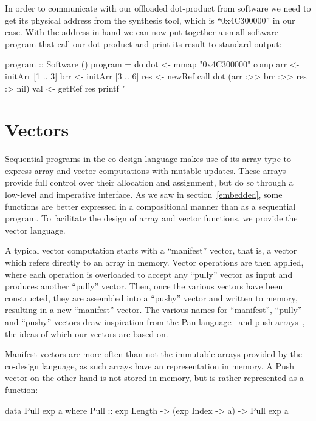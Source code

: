 \documentclass[../paper.tex]{subfiles}
\begin{document}
In order to communicate with our offloaded dot-product from software we need to get its physical address from the synthesis tool, which is ``0x4C300000'' in our case. With the address in hand we can now put together a small software program that call our dot-product and print its result to standard output:

\begin{code}
program :: Software ()
program = do
  dot <- mmap "0x4C300000" comp
  arr <- initArr [1 .. 3]
  brr <- initArr [3 .. 6]
  res <- newRef
  call dot (arr :>> brr :>> res :> nil)
  val <- getRef res
  printf "%
\end{code}

\section{Vectors}
\label{vectors}

Sequential programs in the co-design language makes use of its array type to express array and vector computations with mutable updates. These arrays provide full control over their allocation and assignment, but do so through a low-level and imperative interface. As we saw in section~\ref{embedded}, some functions are better expressed in a compositional manner than as a sequential program. To facilitate the design of array and vector functions, we provide the vector language. 

A typical vector computation starts with a ``manifest'' vector, that is, a vector which refers directly to an array in memory. Vector operations are then applied, where each operation is overloaded to accept any ``pully'' vector as input and produces another ``pully'' vector. Then, once the various vectors have been constructed, they are assembled into a ``pushy'' vector and written to memory, resulting in a new ``manifest'' vector. The various names for ``manifest'', ``pully'' and ``pushy'' vectors draw inspiration from the Pan language~\cite{elliott2003} and push arrays~\cite{claessen2012}, the ideas of which our vectors are based on.

Manifest vectors are more often than not the immutable arrays provided by the co-design language, as such arrays have an representation in memory. A Push vector on the other hand is not stored in memory, but is rather represented as a function:

\begin{code}
data Pull exp a where
  Pull :: exp Length -> (exp Index -> a) -> Pull exp a
\end{code}
\end{document}
